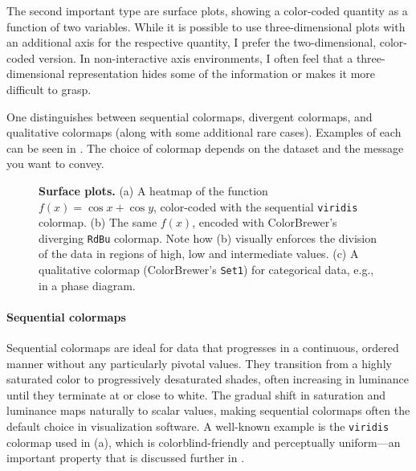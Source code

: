 The second important type are surface plots, showing a color-coded quantity as a function of two variables. While it is possible to use three-dimensional plots with an additional axis for the respective quantity, I prefer the two-dimensional, color-coded version. In non-interactive axis environments, I often feel that a three-dimensional representation hides some of the information or makes it more difficult to grasp.

One distinguishes between sequential colormaps, divergent colormaps, and qualitative colormaps (along with some additional rare cases). Examples of each can be seen in . The choice of colormap depends on the dataset and the message you want to convey.

\begin{figure}
	\centering
	
	\caption{\textbf{Surface plots.} (a) A heatmap of the function $f(x) = \cos x + \cos y$, color-coded with the sequential \texttt{viridis} colormap. (b) The same $f(x)$, encoded with ColorBrewer’s diverging \texttt{RdBu} colormap. Note how (b) visually enforces the division of the data in regions of high, low and intermediate values. (c) A qualitative colormap (ColorBrewer's \texttt{Set1}) for categorical data, e.g., in a phase diagram.}
	\label{fig:surfaceplotflavours}
\end{figure}


\paragraph{Sequential colormaps}
Sequential colormaps are ideal for data that progresses in a continuous, ordered manner without any particularly pivotal values. They transition from a highly saturated color to progressively desaturated shades, often increasing in luminance until they terminate at or close to white. The gradual shift in saturation and luminance maps naturally to scalar values, making sequential colormaps often the default choice in visualization software. A well-known example is the \texttt{viridis} colormap used in (a), which is colorblind-friendly and perceptually uniform---an important property that is discussed further in .

